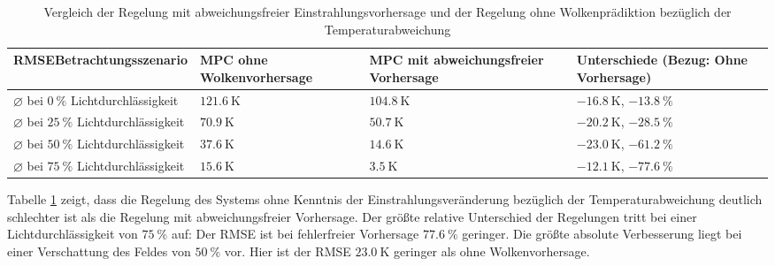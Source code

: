 \begingroup
\renewcommand{\arraystretch}{1.2}
\begin{table}[ht!]
\caption[Vergleich der Regelung mit abweichungsfreier Einstrahlungsvorhersage und der Regelung ohne Wolkenprädiktion bezüglich der Temperaturabweichung]{Vergleich der Regelung mit abweichungsfreier Einstrahlungsvorhersage und der Regelung ohne Wolkenprädiktion bezüglich der Temperaturabweichung}
    \centering
    \begin{tabular}{>{\centering\arraybackslash}m{}>{\centering\arraybackslash}m{}>{\centering\arraybackslash}m{}>{\centering\arraybackslash}m{}}
        \rowcolor{white}
        \toprule
        RMSE\linebreak Betrachtungsszenario                      & MPC ohne Wolkenvorhersage & MPC mit abweichungsfreier Vorhersage & Unterschiede (Bezug: Ohne Vorhersage)         \\
        \midrule
        $\diameter$ bei $\SI{0}{\percent}$ Lichtdurchlässigkeit  & $\SI{121.6}{\kelvin}$     & $\SI{104.8}{\kelvin}$                & $\SI{-16.8}{\kelvin}$, $\SI{-13.8}{\percent}$ \\
        $\diameter$ bei $\SI{25}{\percent}$ Lichtdurchlässigkeit & $\SI{70.9}{\kelvin}$      & $\SI{50.7}{\kelvin}$                 & $\SI{-20.2}{\kelvin}$, $\SI{-28.5}{\percent}$ \\
        $\diameter$ bei $\SI{50}{\percent}$ Lichtdurchlässigkeit & $\SI{37.6}{\kelvin}$      & $\SI{14.6}{\kelvin}$                 & $\SI{-23.0}{\kelvin}$, $\SI{-61.2}{\percent}$ \\
        $\diameter$ bei $\SI{75}{\percent}$ Lichtdurchlässigkeit & $\SI{15.6}{\kelvin}$      & $\SI{3.5}{\kelvin}$                  & $\SI{-12.1}{\kelvin}$, $\SI{-77.6}{\percent}$ \\
        \toprule
    \end{tabular}
    \label{tab_Vergleich2}
\end{table}
\endgroup

Tabelle \ref{tab_Vergleich2} zeigt, dass die Regelung des Systems ohne Kenntnis der Einstrahlungsveränderung bezüglich der Temperaturabweichung deutlich schlechter ist als die Regelung mit abweichungsfreier Vorhersage.
Der größte relative Unterschied der Regelungen tritt bei einer Lichtdurchlässigkeit von $\SI{75}{\percent}$ auf: Der RMSE ist bei fehlerfreier Vorhersage $\SI{77.6}{\percent}$ geringer.
Die größte absolute Verbesserung liegt bei einer Verschattung des Feldes von $\SI{50}{\percent}$ vor.
Hier ist der RMSE $\SI{23.0}{\kelvin}$ geringer als ohne Wolkenvorhersage.\pagebreak

